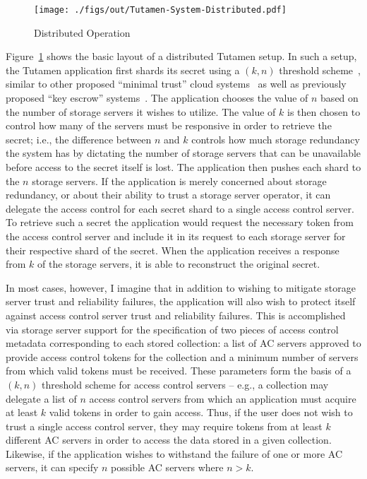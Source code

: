 \begin{figure}[t]
  \centering
  \texttt{[image: ./figs/out/Tutamen-System-Distributed.pdf]}
  \caption{Distributed Operation}
  \label{fig:tutamen:systemdistributed}
\end{figure}

Figure~\ref{fig:tutamen:systemdistributed} shows the basic layout of a
distributed Tutamen setup. In such a setup, the Tutamen application
first shards its secret using a $(k, n)$ threshold
scheme~\cite{krawczyk1993, shamir1979}, similar to other proposed
``minimal trust'' cloud systems~\cite{bessani2011} as well as
previously proposed ``key escrow'' systems~\cite{blaze1996,
  denning1996}. The application chooses the value of $n$ based on the
number of storage servers it wishes to utilize. The value of $k$ is
then chosen to control how many of the servers must be responsive in
order to retrieve the secret; i.e., the difference between $n$ and
$k$ controls how much storage redundancy the system has by dictating
the number of storage servers that can be unavailable before access to
the secret itself is lost. The application then pushes each shard to
the $n$ storage servers. If the application is merely concerned about
storage redundancy, or about their ability to trust a storage server
operator, it can delegate the access control for each secret shard to
a single access control server. To retrieve such a secret the
application would request the necessary token from the access control
server and include it in its request to each storage server for their
respective shard of the secret. When the application receives a
response from $k$ of the storage servers, it is able to reconstruct
the original secret.

In most cases, however, I imagine that in addition to wishing to
mitigate storage server trust and reliability failures, the
application will also wish to protect itself against access control
server trust and reliability failures. This is accomplished via
storage server support for the specification of two pieces of access
control metadata corresponding to each stored collection: a list of AC
servers approved to provide access control tokens for the collection
and a minimum number of servers from which valid tokens must be
received. These parameters form the basis of a $(k, n)$ threshold
scheme for access control servers -- e.g., a collection may delegate a
list of $n$ access control servers from which an application must
acquire at least $k$ valid tokens in order to gain access. Thus, if
the user does not wish to trust a single access control server, they
may require tokens from at least $k$ different AC servers in order to
access the data stored in a given collection. Likewise, if the
application wishes to withstand the failure of one or more AC servers,
it can specify $n$ possible AC servers where $n > k$.

